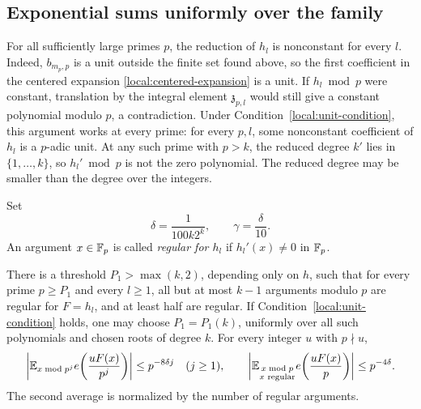 \subsection{Exponential sums uniformly over the family}

For all sufficiently large primes \(p\), the reduction of \(h_l\) is
nonconstant for every \(l\). Indeed, \(b_{m_p,p}\) is a unit outside the
finite set found above, so the first coefficient in the centered expansion
\eqref{local:centered-expansion} is a unit. If \(h_l\bmod p\) were constant,
translation by the integral element \(\mathfrak z_{p,l}\) would still give a
constant polynomial modulo \(p\), a contradiction. Under
Condition~\eqref{local:unit-condition}, this argument works at every prime:
for every \(p,l\), some nonconstant coefficient of \(h_l\) is a
\(p\)-adic unit. At any such prime with \(p>k\), the reduced degree \(k'\)
lies in \(\{1,\ldots,k\}\), so \(h_l'\bmod p\) is not the zero polynomial.
The reduced degree may be smaller than the degree over the integers.

Set
\[
 \delta=\frac{1}{100k2^k},\qquad \gamma=\frac{\delta}{10}.
\]
An argument \(x\in\mathbb F_p\) is called \emph{regular for \(h_l\)} if
\(h_l'(x)\ne0\) in \(\mathbb F_p\).

\begin{lemma}\label{local:sums}
There is a threshold \(P_1>\max(k,2)\), depending only on \(h\), such that
for every prime \(p\ge P_1\) and every \(l\ge1\), all but at most \(k-1\)
arguments modulo \(p\) are regular for \(F=h_l\), and at least half are
regular. If Condition~\eqref{local:unit-condition} holds, one may choose
\(P_1=P_1(k)\), uniformly over all such polynomials and chosen roots of
degree \(k\). For every integer \(u\) with \(p\nmid u\),
\begin{equation}\label{eq:2}
 \left|\mathbb E_{x\bmod p^j}e\!\left(\frac{uF(x)}{p^j}\right)\right|
 \le p^{-8\delta j}\quad(j\ge1),
 \qquad
 \left|\mathbb E_{\substack{x\bmod p\\x\text{ regular}}}
        e\!\left(\frac{uF(x)}p\right)\right|
 \le p^{-4\delta}.
\end{equation}
The second average is normalized by the number of regular arguments.
\end{lemma}

